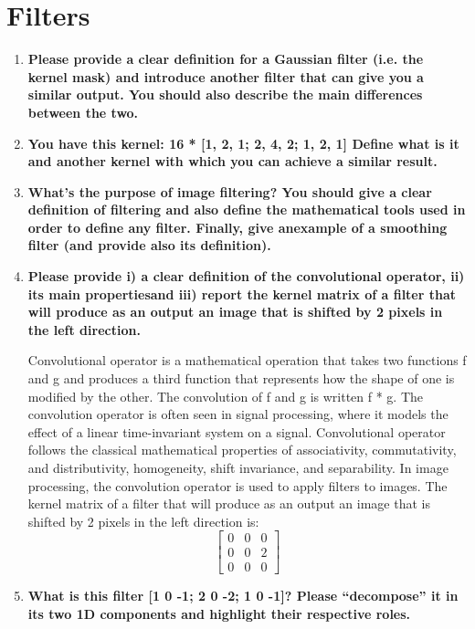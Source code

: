 \documentclass[12pt]{article}
\begin{document}
\section{Filters}
\begin{enumerate}
    \item \textbf{Please provide a clear definition for a Gaussian filter (i.e. the kernel mask) and introduce another filter that can give you a similar output.
    You should also describe the main differences between the two.}

    \item \textbf{You have this kernel:     16 * [1, 2, 1; 2, 4, 2; 1, 2, 1]
    Define what is it and another kernel with which you can achieve a similar result.}

    \item \textbf{What’s the purpose of image filtering?  You should give a clear definition of filtering and also define the mathematical tools used in order to define any filter.
    Finally, give anexample of a smoothing filter (and provide also its definition).}

    \item \textbf{Please provide i) a clear definition of the convolutional operator, ii) its main propertiesand iii) 
    report the kernel matrix of a filter that will produce as an output an image that is shifted by 2 pixels in the left direction.}

    Convolutional operator is a mathematical operation that takes two functions f and g and produces a third function that represents how the shape of one is modified by the other. 
    The convolution of f and g is written f * g. The convolution operator is often seen in signal processing, where it models the effect of a linear time-invariant system on a signal.
    Convolutional operator follows the classical mathematical properties of associativity, commutativity, and distributivity, homogeneity, shift invariance, and separability.
    In image processing, the convolution operator is used to apply filters to images. 
    The kernel matrix of a filter that will produce as an output an image that is shifted by 2 pixels in the left direction is:
    \[
    \begin{bmatrix}
    0 & 0 & 0 \\
    0 & 0 & 2 \\
    0 & 0 & 0
    \end{bmatrix}
    \]

    \item \textbf{What is this filter [1 0 -1; 2 0 -2; 1 0 -1]?  Please “decompose” it in its two 1D components and highlight their respective roles.}
    

\end{enumerate}
\end{document}
